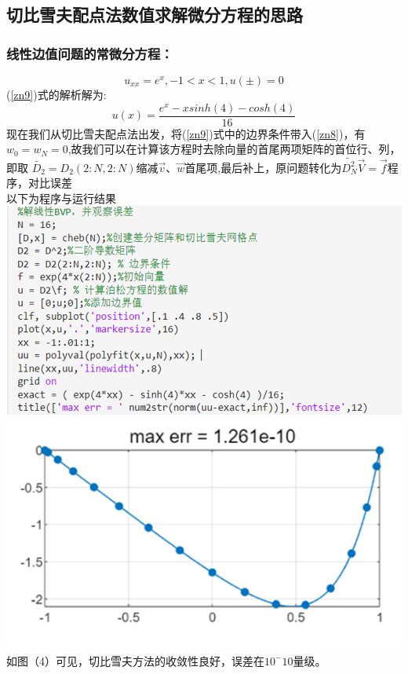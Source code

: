 \documentclass[12pt]{ctexart}
\numberwithin{equation}{section} %
\begin{document}
   \subsection{切比雪夫配点法数值求解微分方程的思路}
   \subsubsection{线性边值问题的常微分方程：}
   \begin{equation}\label{zn9}
        u_{xx}=e^x,-1< x< 1,u(\pm)=0
   \end{equation}
   (\ref{zn9})式的解析解为:
   $$ u(x)=\frac{e^x-xsinh(4)-cosh(4)}{16}$$
  现在我们从切比雪夫配点法出发，将(\ref{zn9})式中的边界条件带入(\ref{zn8})，有$w_0=w_N=0$,故我们可以在计算该方程时去除向量的首尾两项矩阵的首位行、列，即取
  $\widetilde{D_2}=D_2(2:N,2:N)$缩减$\Vec{v}$、$\Vec{w}$首尾项,最后补上，原问题转化为$\widetilde{D^2_N}\Vec{V}=\Vec{f}$程序，对比误差\\
  以下为程序与运行结果\\
  \includegraphics[width=1\textwidth]{程序图3.png}\\
   \includegraphics[width=1\textwidth]{运行结果图2.png}\\
   如图（4）可见，切比雪夫方法的收敛性良好，误差在$10^-{10}$量级。
\end{document}

